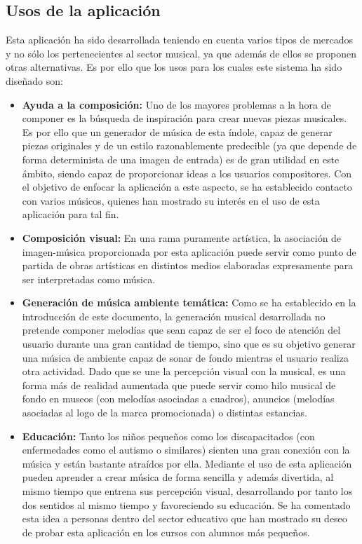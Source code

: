 \subsection{Usos de la aplicación}

Esta aplicación ha sido desarrollada teniendo en cuenta varios tipos de mercados y no sólo los pertenecientes al sector musical, ya que además de ellos se proponen otras alternativas. Es por ello que los usos para los cuales este sistema ha sido diseñado son:

\begin{itemize} 

\item\textbf{Ayuda a la composición:} Uno de los mayores problemas a la hora de componer es la búsqueda de inspiración para crear nuevas piezas musicales. Es por ello que un generador de música de esta índole, capaz de generar piezas originales y de un estilo razonablemente predecible (ya que depende de forma determinista de una imagen de entrada) es de gran utilidad en  este ámbito, siendo capaz de proporcionar ideas a los usuarios compositores. Con el objetivo de enfocar la aplicación a este aspecto, se ha establecido contacto con varios músicos, quienes han mostrado su interés en el uso de esta aplicación para tal fin.

\item\textbf{Composición visual:} En una rama puramente artística, la asociación de imagen-música proporcionada por esta aplicación puede servir como punto de partida de obras artísticas en distintos medios elaboradas expresamente para ser interpretadas como música.

\item\textbf{Generación de música ambiente temática:} Como se ha establecido en la introducción de este documento, la generación musical desarrollada no pretende componer melodías que sean capaz de ser el foco de atención del usuario durante una gran cantidad de tiempo, sino que es su objetivo generar una música de ambiente capaz de sonar de fondo mientras el usuario realiza otra actividad. Dado que se une la percepción visual con la musical, es una forma más de realidad aumentada que puede servir como hilo musical de fondo en museos (con melodías asociadas a cuadros), anuncios (melodías asociadas al logo de la marca promocionada) o distintas estancias.

\item\textbf{Educación:} Tanto los niños pequeños como los discapacitados (con enfermedades como el autismo o similares) sienten una gran conexión con la música y están bastante atraídos por ella. Mediante el uso de esta aplicación pueden aprender a crear música de forma sencilla y además divertida, al mismo tiempo que entrena sus percepción visual, desarrollando por tanto los dos sentidos al mismo tiempo y favoreciendo su educación. Se ha comentado esta idea a personas dentro del sector educativo que han mostrado su deseo de probar esta aplicación en los cursos con alumnos más pequeños.

\end{itemize}

